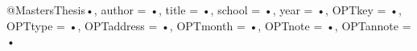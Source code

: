 @MastersThesis{•,
author = {•},
title = {•},
school = {•},
year = {•},
OPTkey = {•},
OPTtype = {•},
OPTaddress = {•},
OPTmonth = {•},
OPTnote = {•},
OPTannote = {•}
}

